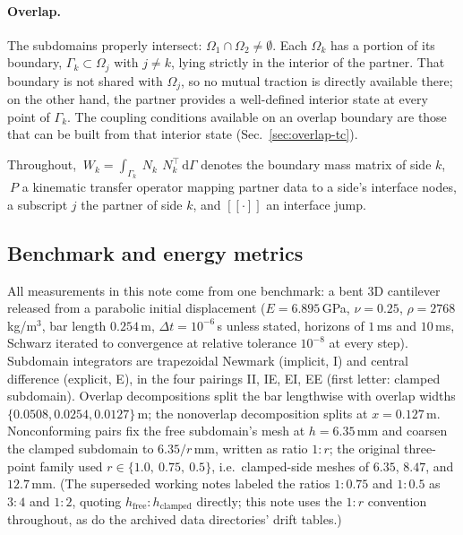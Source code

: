 \documentclass[11pt]{article}
\newcommand{\dd}{\mathrm{d}}
\newcommand{\jump}[1]{[\![#1]\!]}
\begin{document}
\paragraph{Overlap.} The subdomains properly intersect:
$\Omega_1 \cap \Omega_2 \ne \emptyset$. Each $\Omega_k$ has a portion of its
boundary, $\Gamma_k \subset \Omega_j$ with $j \ne k$, lying strictly in the
interior of the partner. That boundary is not shared with $\Omega_j$, so no
mutual traction is directly available there; on the other hand, the partner
provides a well-defined interior state at every point of $\Gamma_k$. The
coupling conditions available on an overlap boundary are those that can be
built from that interior state (Sec.~\ref{sec:overlap-tc}).

Throughout, $~W_k = \int_{\Gamma_k} ~N_k\,~N_k^\top\,\dd\Gamma$ denotes the
boundary mass matrix of side $k$, $~P$ a kinematic transfer operator mapping
partner data to a side's interface nodes, a subscript $j$ the partner of
side $k$, and $\jump{\cdot}$ an interface jump.

\subsection{Benchmark and energy metrics}
\label{sec:benchmark}

All measurements in this note come from one benchmark: a bent 3D cantilever
released from a parabolic initial displacement ($E = 6.895$\,GPa,
$\nu = 0.25$, $\rho = 2768$\,kg/m$^3$, bar length $0.254$\,m,
$\Delta t = 10^{-6}$\,s unless stated, horizons of $1$\,ms and $10$\,ms,
Schwarz iterated to convergence at relative tolerance $10^{-8}$ at every
step). Subdomain integrators are trapezoidal Newmark (implicit, I) and
central difference (explicit, E), in the four pairings II, IE, EI, EE (first
letter: clamped subdomain). Overlap decompositions split the bar lengthwise
with overlap widths $\{0.0508, 0.0254, 0.0127\}$\,m; the nonoverlap
decomposition splits at $x = 0.127$\,m. Nonconforming pairs fix the free
subdomain's mesh at $h = 6.35$\,mm and coarsen the clamped subdomain to
$6.35/r$\,mm, written as ratio $1{:}r$; the original three-point family used
$r \in \{1.0,\ 0.75,\ 0.5\}$, i.e.\ clamped-side meshes of $6.35$, $8.47$,
and $12.7$\,mm. (The superseded working notes labeled the ratios $1{:}0.75$
and $1{:}0.5$ as $3{:}4$ and $1{:}2$, quoting
$h_{\mathrm{free}}{:}h_{\mathrm{clamped}}$ directly; this note uses the
$1{:}r$ convention throughout, as do the archived data directories'
drift tables.)
\end{document}
